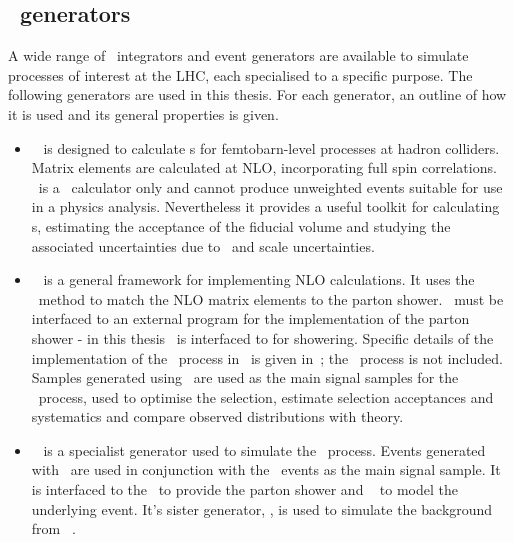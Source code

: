 \subsection{\mc\ generators}
\label{sec:Theory-MC-gen}

A wide range of \mc\ integrators and event generators are available to simulate
processes of interest at the LHC, each specialised to a specific purpose. The
following generators are used in this thesis. For each generator, an outline of
how it is used and its general properties is given.

\begin{itemize}
    \item \mcfm ~\cite{Campbell:2011} is designed to calculate \cx s for
    femtobarn-level processes at hadron colliders. Matrix elements are
    calculated at NLO, incorporating full spin correlations. \mcfm\ is a \cx\
    calculator only and cannot produce unweighted events suitable for use in a
    physics analysis. Nevertheless it provides a useful toolkit for calculating
    \cx s, estimating the acceptance of the fiducial volume and studying the
    associated uncertainties due to \partDF\ and scale uncertainties.

    \item \powhegbox~\cite{Alioli:2010xd} is a general framework for implementing
    NLO calculations. It uses the \powheg\ method to match the NLO matrix
    elements to the parton shower. \powhegbox\ must be interfaced to an external
    program for the implementation of the parton shower - in this thesis
    \powhegbox\ is interfaced to \pythia for showering. Specific details of the
    implementation of the \ZZ\ process in \powhegbox\ is given
    in~\cite{Melia:2011tj}; the \ggZZ\ process is not included. 
    Samples generated using \powhegbox\ are used as the main signal samples for
    the \qqZZ\ process, used to optimise the selection, estimate selection
    acceptances and systematics and compare observed distributions with theory.

    \item \ggtwoZZ~\cite{gg2ZZ} is a specialist generator used to simulate the
    \ggZZ\ process. Events generated with \ggtwoZZ\ are used in conjunction with
    the \powhegbox\ events as the main signal sample. It is interfaced to the
    \herwig\ to provide the parton shower and \jimmy~\cite{bib:jimmy} to model the underlying
    event. It's sister generator, \ggtwoWW, is used to simulate the background
    from \ggZZ~\cite{Binoth:2006mf}.


\end{itemize}
